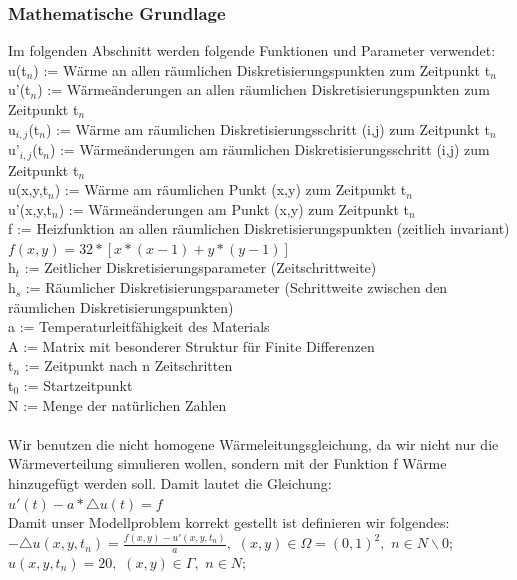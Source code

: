 \documentclass{report}
\begin{document}
\subsubsection{Mathematische Grundlage}
Im folgenden Abschnitt werden folgende Funktionen und Parameter verwendet:\\
u(t$_{n}$) := Wärme an allen räumlichen Diskretisierungspunkten zum Zeitpunkt t$_{n}$\\
u'(t$_{n}$) := Wärmeänderungen an allen räumlichen Diskretisierungspunkten zum Zeitpunkt t$_{n}$\\
u$_{i,j}$(t$_{n}$) := Wärme am räumlichen Diskretisierungsschritt (i,j) zum Zeitpunkt t$_{n}$\\
u'$_{i,j}$(t$_{n}$) := Wärmeänderungen am räumlichen Diskretisierungsschritt (i,j) zum Zeitpunkt t$_{n}$\\
u(x,y,t$_{n}$) := Wärme am räumlichen Punkt (x,y) zum Zeitpunkt t$_{n}$\\
u'(x,y,t$_{n}$) := Wärmeänderungen am Punkt (x,y) zum Zeitpunkt t$_{n}$\\
f := Heizfunktion an allen räumlichen Diskretisierungspunkten (zeitlich invariant) $f(x,y) = 32 * [x*(x-1)+y*(y-1)]$\\
h$_{t}$ := Zeitlicher Diskretisierungsparameter (Zeitschrittweite)\\
h$_{s}$ := Räumlicher Diskretisierungsparameter (Schrittweite zwischen den räumlichen Diskretisierungspunkten)\\
a := Temperaturleitfähigkeit des Materials \\
A := Matrix mit besonderer Struktur für Finite Differenzen\\
t$_{n}$ := Zeitpunkt nach n Zeitschritten\\
t$_{0}$ := Startzeitpunkt\\
N := Menge der natürlichen Zahlen\\
\\
Wir benutzen die nicht homogene Wärmeleitungsgleichung, da wir nicht nur die Wärmeverteilung simulieren wollen, sondern mit der Funktion f Wärme hinzugefügt werden soll. Damit lautet die Gleichung:\\
$u'(t) - a * \triangle u(t) = f$\\
Damit unser Modellproblem korrekt gestellt ist definieren wir folgendes:\\
$- \triangle u(x,y,t_{n}) = \frac{f(x,y)-u'(x,y,t_{n})}{a}   ,$   $  (x,y) \in \Omega = (0,1)^2  ,$   $  n \in N\backslash0;$\\
$u(x,y,t_{n}) = 20,$   $(x,y) \in \Gamma ,$   $ n \in N;$\\
\end{document}
